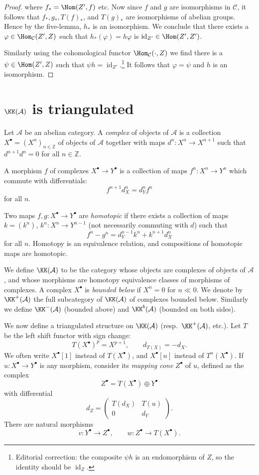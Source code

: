 \begin{proof}
	where $f_* = \Hom(Z', f)$ etc. Now since $f$ and $g$ are isomorphisms in $\mathcal{C}$, it follows that $f_*, g_*, T(f)_*$, and $T(g)_*$ are isomorphisms of abelian groups. Hence by the five-lemma, $h_*$ is an isomorphism. We conclude that there exists a $\varphi \in \Hom_{\mathcal{C}}(Z',Z)$ such that $h_*(\varphi) = h\varphi$ is $\operatorname{id}_{Z'} \in \Hom(Z',Z')$.

	Similarly using the cohomological functor $\Hom_{\mathcal{C}}(\cdot, Z)$ we find there is a $\psi \in \Hom(Z',Z)$ such that $\psi h = \operatorname{id}_{Z'}$.\footnote{Editorial correction: the composite $\psi h$ is an endomorphism of $Z$, so the identity should be $\operatorname{id}_Z$.} It follows that $\varphi = \psi$ and $h$ is an isomorphism.

\end{proof}

\section{$\KK(\mathcal{A})$ is triangulated}\label{sec:1.2}
Let $\mathcal{A}$ be an abelian category. A \emph{complex} of objects of $\mathcal{A}$ is a collection $X^\bullet=(X^n)_{n\in\mathbb{Z}}$ of objects of $\mathcal{A}$ together with maps $d^n\colon X^n\to X^{n+1}$ such that $d^{n+1}d^n=0$ for all $n\in\mathbb{Z}$.

A morphism $f$ of complexes $X^\bullet\to Y^\bullet$ is a collection of maps $f^n\colon X^n\to Y^n$ which commute with differentials:
\[
f^{n+1}d_X^n = d_Y^n f^n
\]
for all $n$.

Two maps $f,g\colon X^\bullet\to Y^\bullet$ are \emph{homotopic} if there exists a collection of maps $k=(k^n)$, $k^n\colon X^n\to Y^{n-1}$ (not necessarily commuting with $d$) such that
\[
f^n - g^n = d_Y^{n-1}k^n + k^{n+1}d_X^n
\]
for all $n$. Homotopy is an equivalence relation, and compositions of homotopic maps are homotopic.

We define $\KK(\mathcal{A})$ to be the category whose objects are complexes of objects of $\mathcal{A}$, and whose morphisms are homotopy equivalence classes of morphisms of complexes. A complex $X^\bullet$ is \emph{bounded below} if $X^n=0$ for $n\ll0$. We denote by $\KK^+(\mathcal{A})$ the full subcategory of $\KK(\mathcal{A})$ of complexes bounded below. Similarly we define $\KK^-(\mathcal{A})$ (bounded above) and $\KK^b(\mathcal{A})$ (bounded on both sides).

We now define a triangulated structure on $\KK(\mathcal{A})$ (resp.\ $\KK^+(\mathcal{A})$, etc.). Let $T$ be the left shift functor with sign change:
\[
T(X^\bullet)^p = X^{p+1},\qquad d_{T(X)} = -d_X.
\]
We often write $X^\bullet[1]$ instead of $T(X^\bullet)$, and $X^\bullet[n]$ instead of $T^n(X^\bullet)$. If $u\colon X^\bullet\to Y^\bullet$ is any morphism, consider its \emph{mapping cone} $Z^\bullet$ of $u$, defined as the complex
\[
Z^\bullet = T(X^\bullet)\oplus Y^\bullet
\]
with differential
\[
d_Z = \begin{pmatrix} T(d_X) & T(u) \\ 0 & d_Y \end{pmatrix}.
\]
There are natural morphisms
\[
v\colon Y^\bullet\to Z^\bullet,\qquad w\colon Z^\bullet\to T(X^\bullet).
\]

